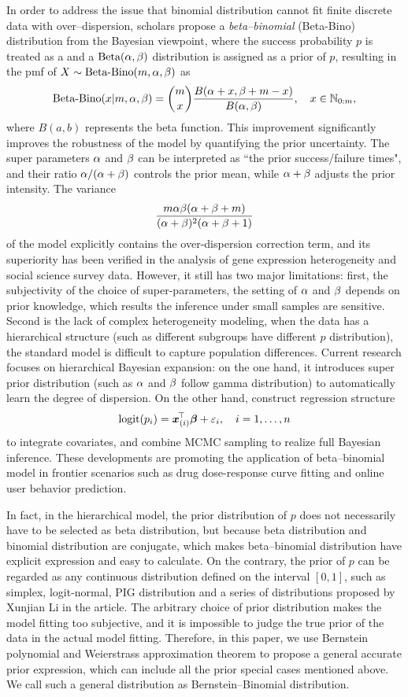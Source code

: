 In order to address the issue that binomial distribution cannot fit finite discrete data with over--dispersion, scholars propose a  \textit{beta--binomial} (Beta-Bino) distribution from the Bayesian viewpoint, where the success probability $p$ is treated as a \trv and a $\mbox{Beta}(\alpha, \beta)$ distribution is assigned as a prior of $p$, resulting in the pmf of $X \sim \mbox{Beta-Bino}(m, \alpha, \beta)$ as
\begin{eqnarray} \label{zyffour1.add1}
   \mbox{Beta-Bino}(x|m, \alpha, \beta) = \binom{m}{x} \frac{B(\alpha+x, \beta + m-x)} {B(\alpha,\beta)}, \quad x \in {\mathbb{N}}_{0:m},
\end{eqnarray}
where $B(a,b)$ represents the beta function. This improvement significantly improves the robustness of the model by quantifying the prior uncertainty. The super parameters $\alpha$ and $\beta$ can be interpreted as ``the prior success/failure times", and their ratio $\alpha/(\alpha+\beta)$ controls the prior mean, while $\alpha+\beta$ adjusts the prior intensity. The variance
$$
   \frac{m\alpha\beta(\alpha+\beta+m)}{(\alpha+\beta)^2(\alpha+\beta+1)}
$$
of the model explicitly contains the over-dispersion correction term, and its superiority has been verified in the analysis of gene expression heterogeneity and social science survey data. However, it still has two major limitations: first, the subjectivity of the choice of super-parameters, the setting of $\alpha$ and $\beta$ depends on prior knowledge, which results the inference under small samples are sensitive. Second is the lack of complex heterogeneity modeling, when the data has a hierarchical structure (such as different subgroups have different $p$ distribution), the standard model is difficult to capture population differences. Current research focuses on hierarchical Bayesian expansion: on the one hand, it introduces super prior distribution (such as $\alpha$ and $\beta$ follow gamma distribution) to automatically learn the degree of dispersion. On the other hand, construct regression structure
$$
   \mbox{logit}(p_i) = {\boldsymbol{x}}_{(i)}^{\!\top\!}{\boldsymbol{\beta}} + \varepsilon_i, \quad i=1,\ldots,n
$$
to integrate covariates, and combine MCMC sampling to realize full Bayesian inference. These developments are promoting the application of beta--binomial model in frontier scenarios such as drug dose-response curve fitting and online user behavior prediction.

In fact, in the hierarchical model, the prior distribution of $p$ does not necessarily have to be selected as beta distribution, but because beta distribution and binomial distribution are conjugate, which makes beta--binomial distribution have explicit expression and easy to calculate. On the contrary, the prior of $p$ can be regarded as any continuous distribution defined on the interval $[0,1]$, such as simplex, logit-normal, PIG distribution and a series of distributions proposed by Xunjian Li in the article. The arbitrary choice of prior distribution makes the model fitting too subjective, and it is impossible to judge the true prior of the data in the actual model fitting. Therefore, in this paper, we use Bernstein polynomial and Weierstrass approximation theorem to propose a general accurate prior expression, which can include all the prior special cases mentioned above. We call such a general distribution as Bernstein--Binomial distribution.


